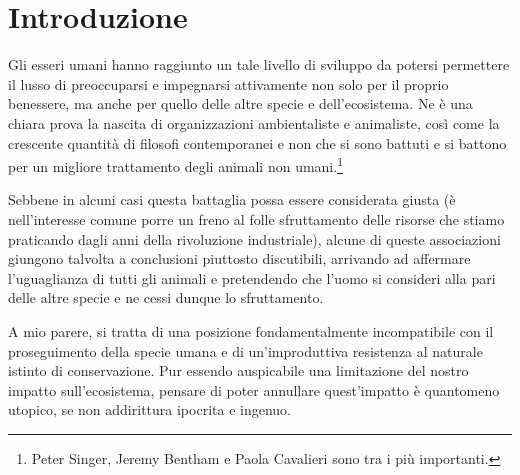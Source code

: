 \chapter{Introduzione}
\label{ch:introduzione}

Gli esseri umani hanno raggiunto un tale livello di sviluppo da potersi permettere il lusso di
preoccuparsi e impegnarsi attivamente non solo per il proprio benessere, ma anche per quello delle
altre specie e dell'ecosistema. Ne è una chiara prova la nascita di organizzazioni ambientaliste e
animaliste, così come la crescente quantità di filosofi contemporanei e non che si sono battuti e si
battono per un migliore trattamento degli animali non umani.\footnote{Peter Singer, Jeremy Bentham e
Paola Cavalieri sono tra i più importanti.}

Sebbene in alcuni casi questa battaglia possa essere considerata giusta (è nell'interesse comune
porre un freno al folle sfruttamento delle risorse che stiamo praticando dagli anni della
rivoluzione industriale), alcune di queste associazioni giungono talvolta a conclusioni piuttosto
discutibili, arrivando ad affermare l'uguaglianza di tutti gli animali e pretendendo che l'uomo si
consideri alla pari delle altre specie e ne cessi dunque lo sfruttamento.

A mio parere, si tratta di una posizione fondamentalmente incompatibile con il proseguimento della
specie umana e di un'improduttiva resistenza al naturale istinto di conservazione. Pur essendo
auspicabile una limitazione del nostro impatto sull'ecosistema, pensare di poter annullare
quest'impatto è quantomeno utopico, se non addirittura ipocrita e ingenuo.
